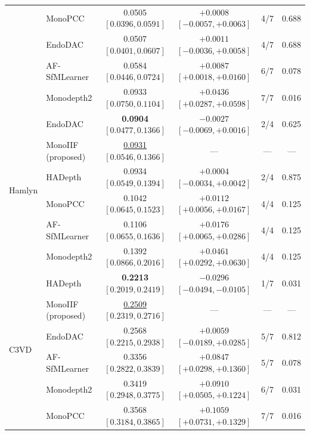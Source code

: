 \documentclass[a4paper,fleqn]{cas-dc}
\begin{document}
{\begin{table}[t]
\begin{tabular}{llcccc}
 & MonoPCC            & 0.0505 $[0.0396, 0.0591]$             & $+0.0008$ $[-0.0057, +0.0063]$          & 4/7   & 0.688 \\
 & EndoDAC            & 0.0507 $[0.0401, 0.0607]$             & $+0.0011$ $[-0.0036, +0.0058]$          & 4/7   & 0.688 \\
 & AF-SfMLearner      & 0.0584 $[0.0446, 0.0724]$             & $\mathbf{+0.0087}$ $[+0.0018, +0.0160]$ & 6/7   & 0.078 \\
 & Monodepth2         & 0.0933 $[0.0750, 0.1104]$             & $\mathbf{+0.0436}$ $[+0.0287, +0.0598]$ & 7/7   & 0.016 \\
\midrule
\multirow{6}{*}{Hamlyn}
 & EndoDAC            & \textbf{0.0904} $[0.0477, 0.1366]$    & $-0.0027$ $[-0.0069, +0.0016]$          & 2/4   & 0.625 \\
 & MonoIIF (proposed) & \underline{0.0931} $[0.0546, 0.1366]$ & ---                                     & ---   & ---   \\
 & HADepth            & 0.0934 $[0.0549, 0.1394]$             & $+0.0004$ $[-0.0034, +0.0042]$          & 2/4   & 0.875 \\
 & MonoPCC            & 0.1042 $[0.0645, 0.1523]$             & $\mathbf{+0.0112}$ $[+0.0056, +0.0167]$ & 4/4   & 0.125 \\
 & AF-SfMLearner      & 0.1106 $[0.0655, 0.1636]$             & $\mathbf{+0.0176}$ $[+0.0065, +0.0286]$ & 4/4   & 0.125 \\
 & Monodepth2         & 0.1392 $[0.0866, 0.2016]$             & $\mathbf{+0.0461}$ $[+0.0292, +0.0630]$ & 4/4   & 0.125 \\
\midrule
\multirow{6}{*}{C3VD}
 & HADepth            & \textbf{0.2213} $[0.2019, 0.2419]$    & $\mathbf{-0.0296}$ $[-0.0494, -0.0105]$ & 1/7   & 0.031 \\
 & MonoIIF (proposed) & \underline{0.2509} $[0.2319, 0.2716]$ & ---                                     & ---   & ---   \\
 & EndoDAC            & 0.2568 $[0.2215, 0.2938]$             & $+0.0059$ $[-0.0189, +0.0285]$          & 5/7   & 0.812 \\
 & AF-SfMLearner      & 0.3356 $[0.2822, 0.3839]$             & $\mathbf{+0.0847}$ $[+0.0298, +0.1360]$ & 5/7   & 0.078 \\
 & Monodepth2         & 0.3419 $[0.2948, 0.3775]$             & $\mathbf{+0.0910}$ $[+0.0505, +0.1224]$ & 6/7   & 0.031 \\
 & MonoPCC            & 0.3568 $[0.3184, 0.3865]$             & $\mathbf{+0.1059}$ $[+0.0731, +0.1329]$ & 7/7   & 0.016 \\
\bottomrule
\end{tabular}
\end{table}

}
\end{document}
